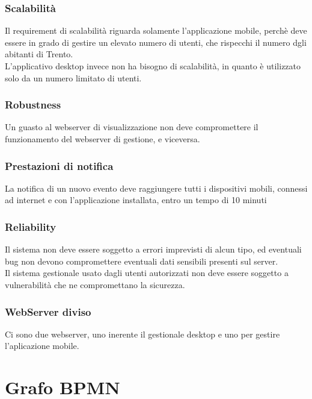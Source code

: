 \documentclass{article}
\begin{document}
\subsubsection{Scalabilità}
Il requirement di scalabilità riguarda solamente l'applicazione mobile, perchè deve essere in grado di gestire un elevato numero di utenti, che rispecchi il numero dgli abitanti di Trento.\\
L'applicativo desktop invece non ha bisogno di scalabilità, in quanto è utilizzato solo da un numero limitato di utenti.

\subsubsection{Robustness}
Un guasto al webserver di visualizzazione non deve compromettere il funzionamento del webserver di gestione, e viceversa.

\subsubsection{Prestazioni di notifica}
La notifica di un nuovo evento deve raggiungere tutti i dispositivi mobili, connessi ad internet e con l'applicazione installata, entro un tempo di 10 minuti

\subsubsection{Reliability}
Il sistema non deve essere soggetto a errori imprevisti di alcun tipo, ed eventuali bug non devono compromettere eventuali dati sensibili presenti sul server.\\
Il sistema gestionale usato dagli utenti autorizzati non deve essere soggetto a vulnerabilità che ne compromettano la sicurezza. 

\subsubsection{WebServer diviso}
Ci sono due webserver, uno inerente il gestionale desktop e uno per gestire l'aplicazione mobile.

\clearpage

\section{Grafo BPMN}
\clearpage
\end{document}
